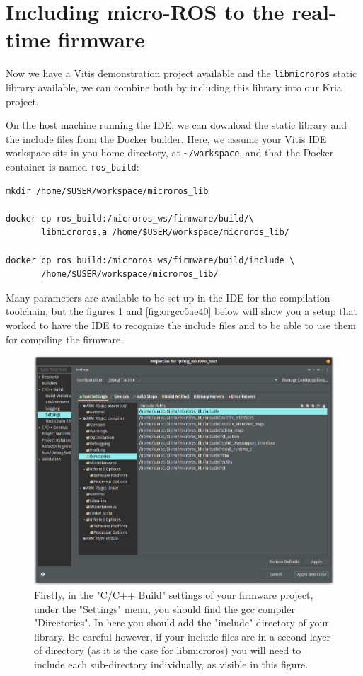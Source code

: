 \documentclass[10pt]{article}
\begin{document}
\section{Including micro-ROS to the real-time firmware}
\label{sec:org4caa854}
Now we have a Vitis demonstration project available and the \texttt{libmicroros} static library
available, we can combine both by including this library into our Kria project.

On the host machine running the IDE, we can download the static library
and the include files from the Docker builder.
Here, we assume your Vitis IDE workspace sits in you home directory, at \texttt{\textasciitilde{}/workspace},
and that the Docker container is named \texttt{ros\_build}:
\begin{verbatim}
mkdir /home/$USER/workspace/microros_lib

docker cp ros_build:/microros_ws/firmware/build/\
       libmicroros.a /home/$USER/workspace/microros_lib/

docker cp ros_build:/microros_ws/firmware/build/include \
       /home/$USER/workspace/microros_lib/
\end{verbatim}

Many parameters are available to be set up in the IDE for the compilation toolchain, but
the figures \ref{fig:orgf120219} and \ref{fig:orgcc5ae40} below will show you a setup that worked to have the IDE
to recognize the include files and to be able to use them for compiling the firmware.

\begin{figure}[htbp]
\centering
\includegraphics[width=.8\textwidth]{./img/vitis_new/include.png}
\caption{\label{fig:orgf120219}Firstly, in the "C/C++ Build" settings of your firmware project, under the "Settings" menu, you should find the gcc compiler "Directories". In here you should add the "include" directory of your library. Be careful however, if your include files are in a second layer of directory (as it is the case for libmicroros) you will need to include each sub-directory individually, as visible in this figure.}
\end{figure}
\end{document}
